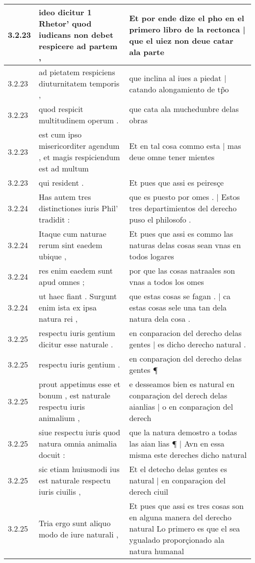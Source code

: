 \begin{tabular}{|p{1cm}|p{6.5cm}|p{6.5cm}|}
3.2.23 & ideo dicitur 1 Rhetor’ quod iudicans non debet respicere ad partem , & Et por ende dize el pho en el primero libro de la rectonca | que el uiez non deue catar ala parte \\\hline
3.2.23 & ad pietatem respiciens diuturnitatem temporis , & que inclina al iues a piedat | catando alongamiento de tp̃o \\\hline
3.2.23 & quod respicit multitudinem operum . & que cata ala muchedunbre delas obras \\\hline
3.2.23 & est cum ipso misericorditer agendum , et magis respiciendum est ad multum & Et en tal cosa commo esta | mas deue omne tener mientes \\\hline
3.2.23 & qui resident . & Et pues que assi es peiresçe \\\hline
3.2.24 & Has autem tres distinctiones iuris Phil’ tradidit : & que es puesto por omes . | Estos tres departimientos del derecho puso el philosofo . \\\hline
3.2.24 & Itaque cum naturae rerum sint eaedem ubique , & Et pues que assi es commo las naturas delas cosas sean vnas en todos logares \\\hline
3.2.24 & res enim eaedem sunt apud omnes ; & por que las cosas natraales son vnas a todos los omes \\\hline
3.2.24 & ut haec fiant . Surgunt enim ista ex ipsa natura rei , & que estas cosas se fagan . | ca estas cosas sele una tan dela natura dela cosa . \\\hline
3.2.25 & respectu iuris gentium dicitur esse naturale . & en conparacion del derecho delas gentes | es dicho derecho natural . \\\hline
3.2.25 & respectu iuris gentium . & en conparaçion del derecho delas gentes ¶ \\\hline
3.2.25 & prout appetimus esse et bonum , est naturale respectu iuris animalium , & e desseamos bien es natural en conparaçion del derech delas aianlias | o en conparaçion del derech \\\hline
3.2.25 & siue respectu iuris quod natura omnia animalia docuit : & que la natura demostro a todas las aian lias ¶ | Avn en essa misma este dereches dicho natural \\\hline
3.2.25 & sic etiam huiusmodi ius est naturale respectu iuris ciuilis , & Et el detecho delas gentes es natural | en conparaçion del derech ciuil \\\hline
3.2.25 & Tria ergo sunt aliquo modo de iure naturali , & Et pues que assi es tres cosas son en alguna manera del derecho natural Lo primero es que el sea ygualado proporçionado ala natura humanal \\\hline

\end{tabular}
